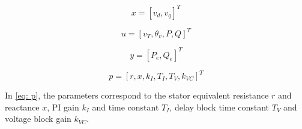 \begin{equation}
	x = [v_{d}, v_{q}]^T
	\label{eq: x}
\end{equation}

\begin{equation}
	u = [v_{T}, \theta_{v}, P, Q]^T
	\label{eq: u}
\end{equation}

\begin{equation}
	y = [P_{e}, Q_{e}]^T
	\label{eq: y}
\end{equation}

\begin{equation}
	p = [r, x, k_{I}, T_{I}, T_{V}, k_{VC}]^T
	\label{eq: p}
\end{equation}

In \eqref{eq: p}, the parameters correspond to the stator equivalent resistance $r$ and reactance $x$, PI gain $k_{I}$ and time constant $T_{I}$, delay block time constant $T_{V}$ and voltage block gain $k_{VC}$.